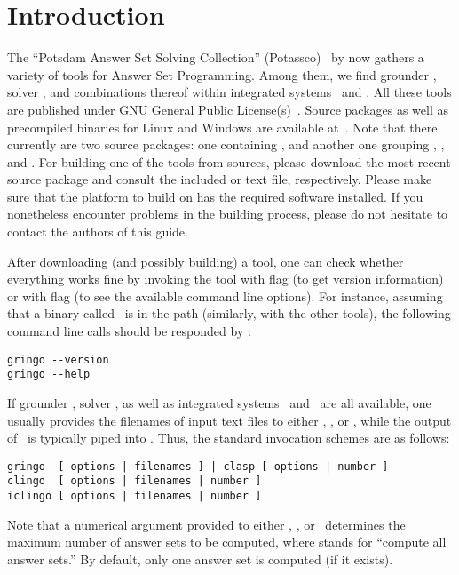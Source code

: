 \section{Introduction}\label{sec:introduction}

The ``Potsdam Answer Set Solving Collection'' (Potassco)~\cite{potassco}
by now gathers a variety of tools for Answer Set Programming.
Among them, we find grounder \gringo, solver \clasp, and
combinations thereof within integrated systems \clingo\ and \iclingo.
All these tools are published under GNU General Public License(s)~\cite{GNUgpl}.
Source packages as well as precompiled binaries for Linux and Windows are available at~\cite{potassco}.
Note that there currently are two source packages:
one containing \clasp, and another one grouping \gringo, \clingo, and \iclingo.
For building one of the tools from sources,
please download the most recent source package and consult the
included  or  text file, respectively.
Please make sure that the platform to build on has the
required software installed.
If you nonetheless encounter problems in the building process,
please do not hesitate to contact the authors of this guide.

After downloading (and possibly building) a tool,
one can check whether everything works fine by invoking the tool
with flag  (to get version information) or
with flag  (to see the available command line options).
For instance, assuming that a binary called \gringo\ is in the path
(similarly, with the other tools),
the following command line calls should be responded by \gringo:
%
\begin{lstlisting}[numbers=none]
gringo --version
gringo --help
\end{lstlisting}
If grounder \gringo, solver \clasp, as well as integrated systems
\clingo\ and \iclingo\ are all available,
one usually provides the filenames of input text files to either
\gringo, \clingo, or \iclingo, while the output of \gringo\ is
typically piped into \clasp.
Thus, the standard invocation schemes are as follows:
\begin{lstlisting}[numbers=none]
gringo  [ options | filenames ] | clasp [ options | number ]
clingo  [ options | filenames | number ]
iclingo [ options | filenames | number ]
\end{lstlisting}
Note that a numerical argument provided to either \clasp, \clingo, or \iclingo\
determines the maximum number of answer sets to be computed,
where  stands for ``compute all answer sets.''
By default, only one answer set is computed (if it exists).

